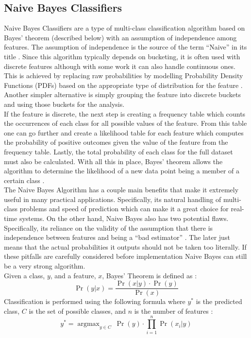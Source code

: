 \documentclass[titlepage]{article}
\DeclareMathOperator*{\argmax}{argmax}
\begin{document}
\subsection{Naive Bayes Classifiers}
Naive Bayes Classifiers are a type of multi-class classification algorithm based on Bayes' theorem (described below) with an assumption of independence among features. The assumption of independence is the source of the term ``Naive'' in its title \cite{NaiveBayesOG}. Since this algorithm typically depends on bucketing, it is often used with discrete features although with some work it can also handle continuous ones. This is achieved by replacing raw probabilities by modelling Probability Density Functions (PDFs) based on the appropriate type of distribution for the feature \cite{NaiveBayesOG}. Another simpler alternative is simply grouping the feature into discrete buckets and using those buckets for the analysis.\\
If the feature is discrete, the next step is creating a frequency table which counts the occurrences of each class for all possible values of the feature. From this table one can go further and create a likelihood table for each feature which computes the probability of positive outcomes given the value of the feature from the frequency table. Lastly, the total probability of each class for the full dataset must also be calculated. With all this in place, Bayes' theorem allows the algorithm to determine the likelihood of a new data point being a member of a certain class \cite{NaiveBayesOG}.\\
The Naive Bayes Algorithm has a couple main benefits that make it extremely useful in many practical applications. Specifically, its natural handling of multi-class problems and speed of prediction which can make it a great choice for real-time systems. On the other hand, Naive Bayes also has two potential flaws. Specifically, its reliance on the validity of the assumption that there is independence between features and being a ``bad estimator'' \cite{NaiveBayesEstimator}. The later just means that the actual probabilities it outputs should not be taken too literally. If these pitfalls are carefully considered before implementation Naive Bayes can still be a very strong algorithm.\\
Given a class, $y$, and a feature, $x$, Bayes' Theorem is defined as \cite{NaiveBayesOG}:
$$\Pr(y \vert x) = \frac{\Pr(x \vert y) \cdot \Pr(y)}{\Pr(x)}$$
Classification is performed using the following formula where $y^*$ is the predicted class, $C$ is the set of possible classes, and $n$ is the number of features \cite{NaiveBayesOG}:
$$y^* = \argmax_{y \in C}~\Pr(y) \cdot \prod\limits_{i=1}^n \Pr(x_i \vert y)$$
\end{document}

